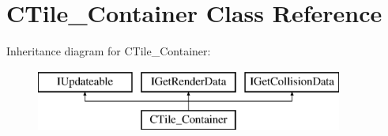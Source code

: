 \hypertarget{classCTile__Container}{\section{C\-Tile\-\_\-\-Container Class Reference}
\label{classCTile__Container}
}
Inheritance diagram for C\-Tile\-\_\-\-Container\-:\begin{figure}[H]
\begin{center}
\leavevmode
\includegraphics[height=2.000000cm]{classCTile__Container}
\end{center}
\end{figure}
